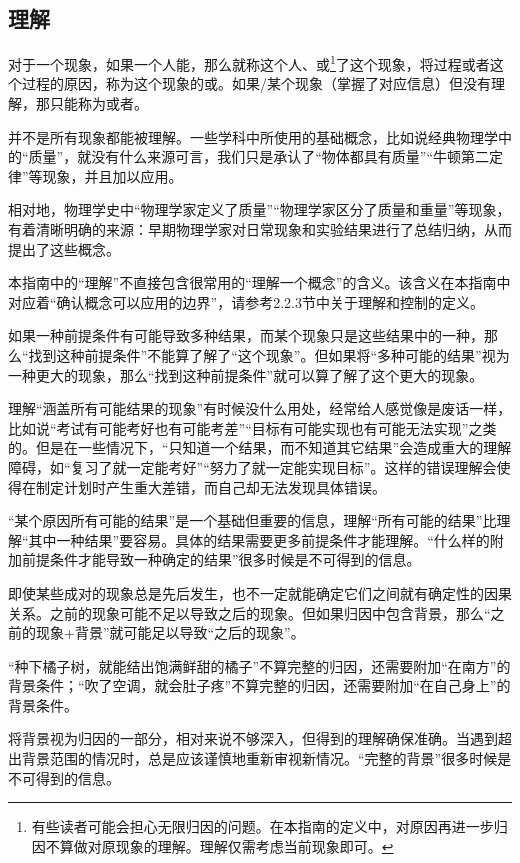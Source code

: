 \subsection{理解}
对于一个现象，如果一个人能，那么就称这个人、或\footnote{有些读者可能会担心无限归因的问题。在本指南的定义中，对原因再进一步归因不算做对原现象的理解。理解仅需考虑当前现象即可。}了这个现象，将过程或者这个过程的原因，称为这个现象的或。如果/某个现象（掌握了对应信息）但没有理解，那只能称为或者。
\begin{examples}
并不是所有现象都能被理解。一些学科中所使用的基础概念，比如说经典物理学中的“质量”，就没有什么来源可言，我们只是承认了“物体都具有质量”“牛顿第二定律”等现象，并且加以应用。

相对地，物理学史中“物理学家定义了质量”“物理学家区分了质量和重量”等现象，有着清晰明确的来源：早期物理学家对日常现象和实验结果进行了总结归纳，从而提出了这些概念。

本指南中的“理解”不直接包含很常用的“理解一个概念”的含义。该含义在本指南中对应着“确认概念可以应用的边界”，请参考2.2.3节中关于理解和控制的定义。
\end{examples}
如果一种前提条件有可能导致多种结果，而某个现象只是这些结果中的一种，那么“找到这种前提条件”不能算了解了“这个现象”。但如果将“多种可能的结果”视为一种更大的现象，那么“找到这种前提条件”就可以算了解了这个更大的现象。
\begin{examples}
理解“涵盖所有可能结果的现象”有时候没什么用处，经常给人感觉像是废话一样，比如说“考试有可能考好也有可能考差”“目标有可能实现也有可能无法实现”之类的。但是在一些情况下，“只知道一个结果，而不知道其它结果”会造成重大的理解障碍，如“复习了就一定能考好”“努力了就一定能实现目标”。这样的错误理解会使得在制定计划时产生重大差错，而自己却无法发现具体错误。

“某个原因所有可能的结果”是一个基础但重要的信息，理解“所有可能的结果”比理解“其中一种结果”要容易。具体的结果需要更多前提条件才能理解。“什么样的附加前提条件才能导致一种确定的结果”很多时候是不可得到的信息。
\end{examples}
即使某些成对的现象总是先后发生，也不一定就能确定它们之间就有确定性的因果关系。之前的现象可能不足以导致之后的现象。但如果归因中包含背景，那么“之前的现象+背景”就可能足以导致“之后的现象”。
\begin{examples}
“种下橘子树，就能结出饱满鲜甜的橘子”不算完整的归因，还需要附加“在南方”的背景条件；“吹了空调，就会肚子疼”不算完整的归因，还需要附加“在自己身上”的背景条件。

将背景视为归因的一部分，相对来说不够深入，但得到的理解确保准确。当遇到超出背景范围的情况时，总是应该谨慎地重新审视新情况。“完整的背景”很多时候是不可得到的信息。
\end{examples}
